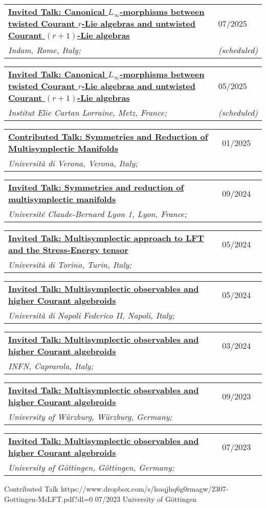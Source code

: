 \documentclass[a4paper]{article}
\newcommand{\longvoice}[8]{
	\begin{tabular}{p{0.83\linewidth} p{0.17\linewidth} }
		\textbf{\href{#3}{#2: #1}} & #4 
		\\ 
		\textit{#5, #6, #7;} & {\small\emph{#8}}
	\end{tabular}
	\vspace{.5em}
}
\begin{document}
    \longvoice{Canonical $L_\infty$-morphisms between twisted Courant $r$-Lie algebras and untwisted Courant $(r+1)$-Lie algebras}
        {Invited Talk}
        {https://www.mat.uniroma2.it/~kowalzig/ws.html}
        {07/2025}
        {Indam}
        {Rome}
        {Italy}
        {(scheduled)}
    \longvoice{Canonical $L_\infty$-morphisms between twisted Courant $r$-Lie algebras and untwisted Courant $(r+1)$-Lie algebras}
        {Invited Talk}
        {https://iecl.univ-lorraine.fr/events/antonio-miti-rome-titre-a-venir/}
        {05/2025}
        {Institut Elie Cartan Lorraine}
        {Metz}
        {France}
        {(scheduled)}
    \longvoice{Symmetries and Reduction of Multisymplectic Manifolds}
        {Contributed Talk}
        {https://sites.google.com/view/xix-yrw-verona/home}
        {01/2025}
        {Università di Verona}
        {Verona}
        {Italy}
        {}
	\longvoice{Symmetries and reduction of multisymplectic manifolds}
		{Invited Talk}
		{https://indico.math.cnrs.fr/event/12743/contributions/12152/}
		{09/2024}
		{Université Claude-Bernard Lyon 1}
		{Lyon}
		{France}
		{}
	\longvoice{Multisymplectic approach to LFT and the Stress-Energy tensor}
		{Invited Talk}
		{https://www.researchgate.net/publication/381297576_Multisymplectic_approach_to_LFT_the_Stress-Energy_tensor}
		{05/2024}
		{Università di Torino}
		{Turin}
		{Italy}
		{}
	\longvoice{Multisymplectic observables and higher Courant algebroids}
		{Invited Talk}
		{https://sites.google.com/view/poisson2024/seminars-workshops?authuser=0}
		{05/2024}
		{Università di Napoli Federico II}
		{Napoli}
		{Italy}
		{}
	\longvoice{Multisymplectic observables and higher Courant algebroids}
		{Invited Talk}
		{http://wpage.unina.it/francesco.dandrea/Caprarola2024/speakers.html}
		{03/2024}
		{INFN}
		{Caprarola}
		{Italy}
		{}
	\longvoice{Multisymplectic observables and higher Courant algebroids}
		{Invited Talk}
		{https://www.mathematik.uni-wuerzburg.de/mathematicalphysics/forschung/veranstaltungen/workshops-und-konferenzen/single/news/poisson-geometry-higher-structures-and-deformation-theory/}
		{09/2023}
		{University of Würzburg}
		{Würzburg}
		{Germany}
		{}
	\longvoice{Multisymplectic observables and higher Courant algebroids}
		{Invited Talk}
		{https://www.uni-goettingen.de/de/50226.html?cid=844690}
		{07/2023}
		{University of Göttingen}
		{Göttingen}
		{Germany}
		{}
		{Contributed Talk}
		{https://www.dropbox.com/s/lsaqjhq6g0rmagw/2307-Gottingen-MsLFT.pdf?dl=0}
		{07/2023}
		{University of Göttingen}
\end{document}

